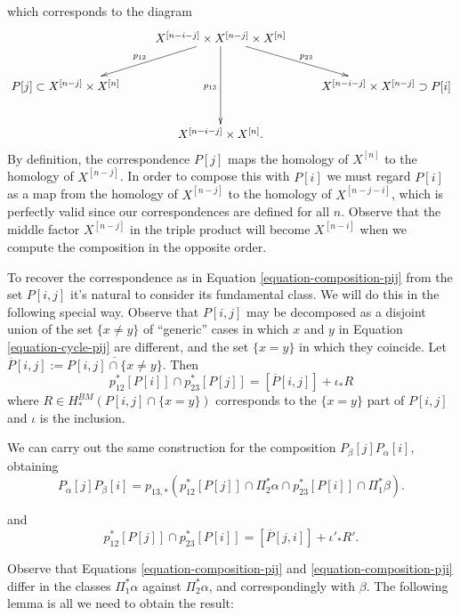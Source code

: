 \noindent
which corresponds to the diagram
$$
\xymatrix{
&  X^{[n-i-j]} \times X^{[n-j]} \times X^{[n]}
\ar[dl]_{p_{12}}\ar[dr]^{p_{23}}\ar[dd]_{p_{13}}\\
P[j]\subset X^{[n-j]}\times X^{[n]}& & X^{[n-i-j]}\times X^{[n-j]}\supset P[i]\\
& X^{[n-i-j]}\times X^{[n]}.
}
$$
By definition, the correspondence $P[j]$ maps the homology of $X^{[n]}$ to the 
homology of $X^{[n-j]}$. In order to compose this with $P[i]$
we must regard $P[i]$ as a map from the homology of $X^{[n-j]}$ 
to the homology of $X^{[n-j-i]}$, which is perfectly
valid since our correspondences are defined for all $n$.
Observe that the middle factor $X^{[n-j]}$
in the triple product will become $X^{[n-i]}$ when
we compute the composition in the opposite order.

\medskip\noindent
To recover the correspondence as in 
Equation \ref{equation-composition-pij}
from the set $P[i,j]$ it's natural to consider its 
fundamental class.
We will do this in the following special way.
Observe that $P[i,j]$ may be decomposed as a disjoint union
of the set $\{x \neq y\}$ 
of ``generic'' cases in which $x$ and $y$ in Equation \ref{equation-cycle-pij}
are different, and the set $\{x=y\}$ in which they coincide.
Let $\overline{P}[i,j]:=\overline{P[i,j]\cap\{x\neq y\}}$.
Then
$$
p_{12}^* [P[i]]\cap p_{23}^* [P[j]]=[\overline{P}[i,j]]+\iota_*R
$$
where $R \in H_*^{BM}(P[i,j]\cap \{x=y\})$ corresponds
to the $\{x=y\}$ part of $P[i,j]$ 
and $\iota$ is the inclusion.

\medskip\noindent
We can carry out the same construction
for the composition $P_\beta[j]P_\alpha[i]$,
obtaining
\begin{equation}
\label{equation-composition-pji}
P_\alpha[j]P_\beta[i]
=p_{13,*}(p_{12}^*[P[j]]\cap\Pi_2^*\alpha\cap p_{23}^*[P[i]]\cap\Pi_1^*\beta).
\end{equation}

\noindent
and
\begin{equation}
\label{equation-pji-r}
p_{12}^* [P[j]]\cap p_{23}^* [P[i]]=[\overline{P}[j,i]]+\iota'_*R'.
\end{equation}

\noindent
Observe that Equations \ref{equation-composition-pij} and
\ref{equation-composition-pji} differ in the classes
$\Pi_1^*\alpha$ against $\Pi_2^*\alpha$, and correspondingly with $\beta$.
The following lemma is all we need to obtain the result:

